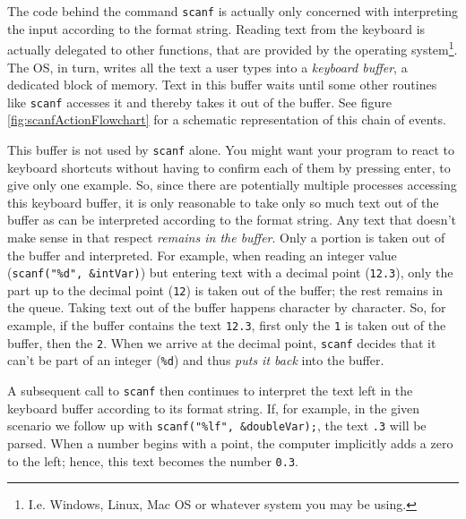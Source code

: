 The code behind the command \texttt{scanf} is actually only concerned with interpreting the input according to the format string. Reading text from the keyboard is actually delegated to other functions, that are provided by the operating system\footnote{I.\;e. Windows, Linux, Mac OS or whatever system you may be using.}. The OS, in turn,  writes all the text a user types into a \emph{keyboard buffer}, \ie a dedicated block of memory. Text in this buffer waits until some other routines like \texttt{scanf} accesses it and thereby takes it out of the buffer. See figure \ref{fig:scanfActionFlowchart} for a schematic representation of this chain of events.

This buffer is not used by \texttt{scanf} alone. You might want your program to react to keyboard shortcuts without having to confirm each of them by pressing enter, to give only one example. So, since there are potentially multiple processes accessing this keyboard buffer, it is only reasonable to take only so much text out of the buffer as can be interpreted according to the format string. Any text that doesn't make sense in that respect \emph{remains in the buffer}. Only a portion is taken out of the buffer and interpreted. For example, when reading an integer value 
(\texttt{scanf("\%d", \&intVar)})
but entering text with a decimal point (\eg \texttt{12.3}), only the part up to the decimal point (\texttt{12}) is taken out of the buffer; the rest remains in the queue. Taking text out of the buffer happens character by character. So, for example, if the buffer contains the text \texttt{12.3}, first only the \texttt{1} is taken out of the buffer, then the \texttt{2}. When we arrive at the decimal point, \texttt{scanf} decides that it can't be part of an integer (\texttt{\%d}) and thus \emph{puts it back} into the buffer.

A subsequent call to \texttt{scanf} then continues to interpret the text left in the keyboard buffer according to its format string. If, for example, in the given scenario we follow up with \texttt{scanf("\%lf", \&doubleVar);}, the text \texttt{.3} will be parsed. When a number begins with a point, the computer implicitly adds a zero to the left; hence, this text becomes the number \texttt{0.3}.

